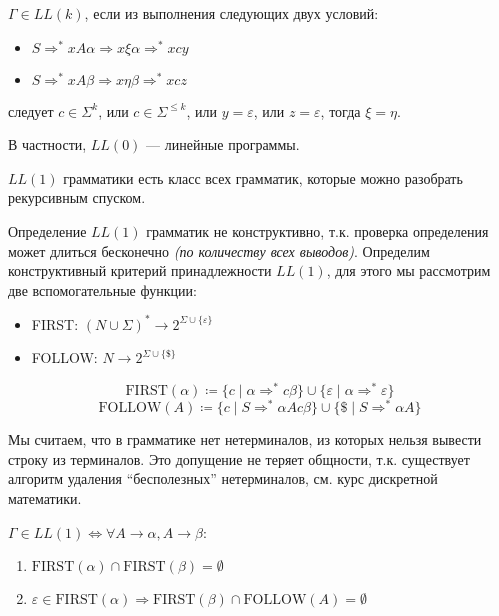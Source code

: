 \begin{definition}
    \(\Gamma \in LL(k)\), если из выполнения следующих двух условий:
    \begin{itemize}
        \item \(S \Rightarrow^* xA\alpha \Rightarrow x\xi\alpha \Rightarrow^* xcy\)
        \item \(S \Rightarrow^* xA\beta \Rightarrow x\eta\beta \Rightarrow^* xcz\)
    \end{itemize}
    следует \(c \in \Sigma^k\), или \(c \in \Sigma^{ \leq k}\), или \(y = \varepsilon\), или \(z = \varepsilon\), тогда \(\xi = \eta\).
\end{definition}

В частности, \(LL(0)\) --- линейные программы.

\(LL(1)\) грамматики есть класс всех грамматик, которые можно разобрать рекурсивным спуском.

Определение \(LL(1)\) грамматик не конструктивно, т.к. проверка определения может длиться бесконечно \textit{(по количеству всех выводов)}. Определим конструктивный критерий принадлежности \(LL(1)\), для этого мы рассмотрим две вспомогательные функции:

\begin{itemize}
    \item FIRST: \((N \cup \Sigma)^* \to 2^{\Sigma \cup \{\varepsilon\}}\)
    \item FOLLOW: \(N \to 2^{\Sigma \cup \{\$\}}\)
\end{itemize}
\[\mathrm{FIRST}(\alpha) \coloneqq \{c \mid \alpha \Rightarrow^* c \beta\} \cup \{\varepsilon \mid \alpha \Rightarrow^* \varepsilon\}\]
\[\mathrm{FOLLOW}(A) \coloneqq \{c \mid S \Rightarrow^* \alpha Ac\beta\} \cup \{\$ \mid S \Rightarrow^* \alpha A\}\]

\begin{remark}
    Мы считаем, что в грамматике нет нетерминалов, из которых нельзя вывести строку из терминалов. Это допущение не теряет общности, т.к. существует алгоритм удаления ``бесполезных'' нетерминалов, см. курс дискретной математики.
\end{remark}

\begin{theorem}
    \(\Gamma \in LL(1) \Leftrightarrow \forall A \to \alpha, A \to \beta\):
    \begin{enumerate}
        \item \(\mathrm{FIRST}(\alpha) \cap \mathrm{FIRST}(\beta) = \emptyset\)
        \item \(\varepsilon \in \mathrm{FIRST}(\alpha) \Rightarrow \mathrm{FIRST}(\beta) \cap \mathrm{FOLLOW}(A) = \emptyset\)
    \end{enumerate}
\end{theorem}
